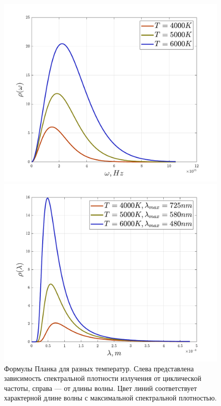 \documentclass[12pt]{article}
\begin{document}
\begin{figure}[h]
    \centering
    \begin{minipage}{0.5\textwidth}
        \centering
        \includegraphics[width=1.0\textwidth]{Seminar_01/pics/pic_04_left.pdf}
    \end{minipage}\hfill
    \begin{minipage}{0.5\textwidth}
        \centering
        \includegraphics[width=1.0\textwidth]{Seminar_01/pics/pic_04_right.pdf}
    \end{minipage}
    \caption{Формулы Планка для разных температур. Слева представлена зависимость спектральной плотности излучения от циклической частоты, справа --- от длины волны. Цвет линий соответствует характерной длине волны с максимальной спектральной плотностью.}
    \label{fig:sem_01_plank_func}
\end{figure}
\end{document}
